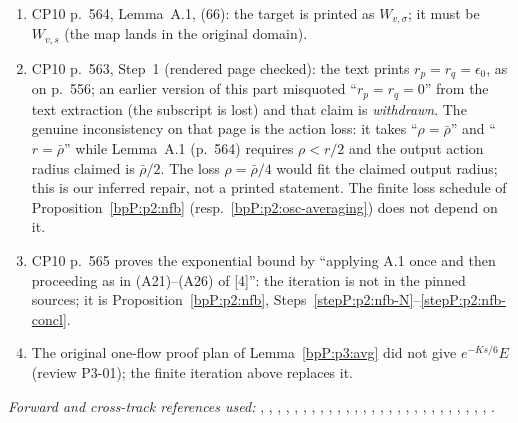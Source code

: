 \begin{enumerate}
\item CP10 p.~564, Lemma~A.1, (66): the target is printed as $W_{v,\sigma}$; it must be $W_{v,s}$ (the map lands in the original domain).
\item CP10 p.~563, Step~1 (rendered page checked): the text prints $r_p=r_q=\epsilon_0$, as on p.~556; an earlier version of this part misquoted ``$r_p=r_q=0$'' from the text extraction (the subscript is lost) and that claim is \emph{withdrawn}. The genuine inconsistency on that page is the action loss: it takes ``$\rho=\bar\rho$'' and ``$r=\bar\rho$'' while Lemma~A.1 (p.~564) requires $\rho<r/2$ and the output action radius claimed is $\bar\rho/2$. The loss $\rho=\bar\rho/4$ would fit the claimed output radius; this is our inferred repair, not a printed statement. The finite loss schedule of Proposition~\ref{bpP:p2:nfb} (resp.\ \ref{bpP:p2:osc-averaging}) does not depend on it.
\item CP10 p.~565 proves the exponential bound by ``applying A.1 once and then proceeding as in (A21)--(A26) of [4]'': the iteration is not in the pinned sources; it is Proposition~\ref{bpP:p2:nfb}, Steps~\ref{stepP:p2:nfb-N}--\ref{stepP:p2:nfb-concl}.
\item The original one-flow proof plan of Lemma~\ref{bpP:p3:avg} did not give $e^{-Ks/6}E$ (review P3-01); the finite iteration above replaces it.
\end{enumerate}
\emph{Forward and cross-track references used:} , , , , , , , , , , , , , , , , , , , , , , , , , , , .
\endgroup
